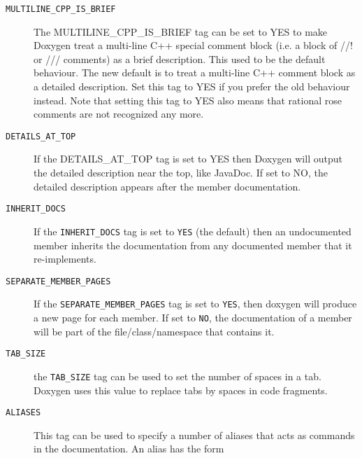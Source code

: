 \begin{description}
\label{config_cfg_multiline_cpp_is_brief}
\hypertarget{config_cfg_multiline_cpp_is_brief}{}
 \item[{\tt MULTILINE\_\-CPP\_\-IS\_\-BRIEF} ] The MULTILINE\_\-CPP\_\-IS\_\-BRIEF tag can be set to YES to make Doxygen treat a multi-line C++ special comment block (i.e. a block of //! or /// comments) as a brief description. This used to be the default behaviour. The new default is to treat a multi-line C++ comment block as a detailed description. Set this tag to YES if you prefer the old behaviour instead. Note that setting this tag to YES also means that rational rose comments are not recognized any more.

\label{config_cfg_details_at_top}
\hypertarget{config_cfg_details_at_top}{}
 \item[{\tt DETAILS\_\-AT\_\-TOP} ] If the DETAILS\_\-AT\_\-TOP tag is set to YES then Doxygen will output the detailed description near the top, like JavaDoc. If set to NO, the detailed description appears after the member documentation.

\label{config_cfg_inherit_docs}
\hypertarget{config_cfg_inherit_docs}{}
 \item[{\tt INHERIT\_\-DOCS} ] If the {\tt INHERIT\_\-DOCS} tag is set to {\tt YES} (the default) then an undocumented member inherits the documentation from any documented member that it re-implements.

\label{config_cfg_separate_member_pages}
\hypertarget{config_cfg_separate_member_pages}{}
 \item[{\tt SEPARATE\_\-MEMBER\_\-PAGES} ] If the {\tt SEPARATE\_\-MEMBER\_\-PAGES} tag is set to {\tt YES}, then doxygen will produce a new page for each member. If set to {\tt NO}, the documentation of a member will be part of the file/class/namespace that contains it.

\label{config_cfg_tab_size}
\hypertarget{config_cfg_tab_size}{}
 \item[{\tt TAB\_\-SIZE} ] the {\tt TAB\_\-SIZE} tag can be used to set the number of spaces in a tab. Doxygen uses this value to replace tabs by spaces in code fragments.

\label{config_cfg_aliases}
\hypertarget{config_cfg_aliases}{}
 \item[{\tt ALIASES} ] This tag can be used to specify a number of aliases that acts as commands in the documentation. An alias has the form 


\end{description}
